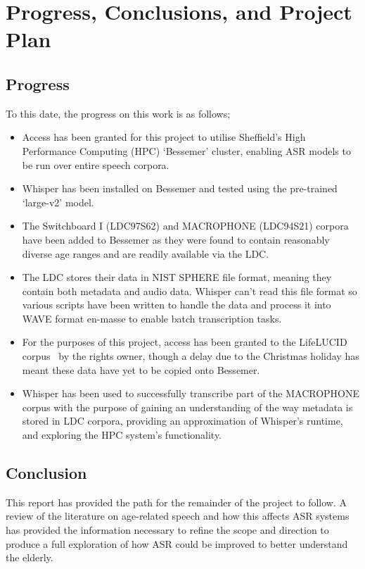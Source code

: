 \chapter{Progress, Conclusions, and Project Plan}\label{ch:conclusions-and-proj-plan}

\section{Progress}\label{sec:progress}

To this date, the progress on this work is as follows;

\begin{itemize}
    \item Access has been granted for this project to utilise Sheffield's High Performance
    Computing (HPC) `Bessemer' cluster, enabling ASR models to be run over entire speech corpora.
    \item Whisper\cite{whisper} has been installed on Bessemer and tested using the pre-trained
    `large-v2' model.
    \item The Switchboard I (LDC97S62)\cite{switchboard-ldc} and MACROPHONE
    (LDC94S21)\cite{macrophone} corpora have been added to Bessemer as they were found to
    contain reasonably diverse age ranges and are readily available via the LDC\@.
    \item The LDC stores their data in NIST SPHERE file format, meaning they contain both
    metadata and audio data.
    Whisper can't read this file format so various scripts have been written to handle the data
    and process it into WAVE format en-masse to enable batch transcription tasks.
    \item For the purposes of this project, access has been granted to the LifeLUCID
    corpus~\cite{lifelucid} by the rights owner, though a delay due to the Christmas holiday has
    meant these data have yet to be copied onto Bessemer.
    \item Whisper has been used to successfully transcribe part of the MACROPHONE corpus with the
    purpose of gaining an understanding of the way metadata is stored in LDC corpora, providing an
    approximation of Whisper's runtime, and exploring the HPC system's functionality.
\end{itemize}

\section{Conclusion}\label{sec:conclusion}

This report has provided the path for the remainder of the project to follow.
A review of the literature on age-related speech and how this affects ASR systems has
provided the information necessary to refine the scope and direction to produce a full
exploration of how ASR could be improved to better understand the elderly.

